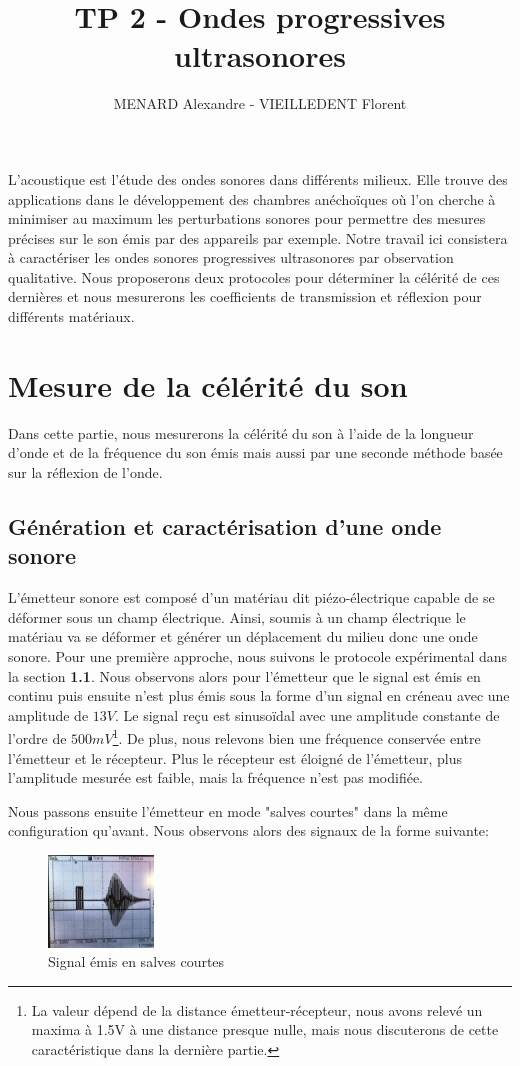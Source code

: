 \documentclass[12pt]{article}
\title{\vspace{-2cm}\textbf{TP 2 - Ondes progressives ultrasonores}}
\author{\vspace{-0.5cm}MENARD Alexandre - VIEILLEDENT Florent}
\date{\vspace{-0.7cm}}
\begin{document}
\maketitle

L'acoustique est l'étude des ondes sonores dans différents milieux. Elle trouve des applications dans le développement des chambres
anéchoïques où l'on cherche à minimiser au maximum les perturbations sonores pour permettre des mesures précises sur le son émis par des appareils par exemple. 
Notre travail ici consistera à caractériser les ondes sonores progressives ultrasonores par observation qualitative. Nous proposerons
deux protocoles pour déterminer la célérité de ces dernières et nous mesurerons les coefficients de transmission et réflexion pour différents matériaux.

\section{Mesure de la célérité du son}
Dans cette partie, nous mesurerons la célérité du son à l'aide de la longueur d'onde et de la fréquence du son émis mais aussi par une seconde méthode basée sur la réflexion de l'onde.

\subsection{Génération et caractérisation d'une onde sonore}
L'émetteur sonore est composé d'un matériau dit piézo-électrique capable de se déformer sous un champ électrique. Ainsi, soumis à un champ électrique
le matériau va se déformer et générer un déplacement du milieu donc une onde sonore. Pour une première approche, nous suivons le protocole
expérimental dans la section \textbf{1.1}. Nous observons alors pour l'émetteur que le signal est émis en continu puis ensuite n'est plus émis sous la forme d'un signal en créneau avec une amplitude de $13V$.
Le signal reçu est sinusoïdal avec une amplitude constante de l'ordre de $500mV$\footnote{La valeur dépend de la distance émetteur-récepteur, nous avons relevé un maxima à 1.5V à une distance presque nulle, mais nous discuterons de cette caractéristique dans la dernière partie.}. De plus, nous relevons bien une fréquence conservée entre l'émetteur et le récepteur. Plus le récepteur est éloigné de l'émetteur, plus l'amplitude mesurée est faible, mais la fréquence n'est pas modifiée.

Nous passons ensuite l'émetteur en mode "salves courtes" dans la même configuration qu'avant. Nous observons alors des signaux de la forme suivante:
\begin{figure}[!htbp]
	\centering
	\includegraphics[width=0.25\textwidth]{img/salves_courtes.jpg}
	\hfill
	\caption{Signal émis en salves courtes}
\end{figure}
\end{document}
